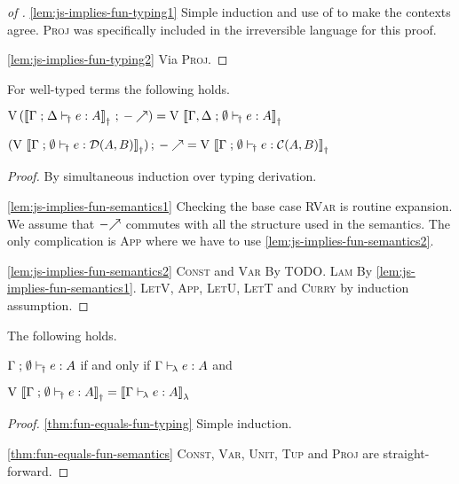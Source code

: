 \documentclass[runningheads,envcountsame]{llncs}
\begin{document}
    \begin{proof}[of ]
        \ref{lem:js-implies-fun-typing1} Simple induction and use of  to make the contexts agree. \textsc{Proj} was specifically included in the irreversible language for this proof.
        
        \ref{lem:js-implies-fun-typing2} Via \textsc{Proj}.
    \end{proof}
    
    \begin{lemma} \label{lem:js-implies-fun-semantics}
        For well-typed terms the following holds.
        \begin{lemmalist}
            \item $\uncurry\,(\comp{\semD{\typeruled{\Gamma}{\Delta}{e}{\js}{A}}}{\f{-}}) = \uncurry\,\semD{\typeruled{\Gamma,\Delta}{\emptyset}{e}{\fun}{A}}$ \label{lem:js-implies-fun-semantics1}
            \item $\comp{(\uncurry\,\semD{\typeruled{\Gamma}{\emptyset}{e}{\fun}{\homD{A}{B}}})}{\f{-}} = \uncurry\,\semD{\typeruled{\Gamma}{\emptyset}{e}{\fun}{\homC{A}{B}}}$ \label{lem:js-implies-fun-semantics2}
        \end{lemmalist}
    \end{lemma}
    \begin{proof}
        By simultaneous induction over typing derivation.
        
        \ref{lem:js-implies-fun-semantics1} Checking the base case \textsc{RVar} is routine expansion. We assume that $\f{-}$ commutes with all the structure used in the semantics. The only complication is \textsc{App} where we have to use \ref{lem:js-implies-fun-semantics2}.
        
        \ref{lem:js-implies-fun-semantics2} \textsc{Const} and \textsc{Var} By TODO. \textsc{Lam} By \ref{lem:js-implies-fun-semantics1}. \textsc{LetV}, \textsc{App}, \textsc{LetU}, \textsc{LetT} and \textsc{Curry} by induction assumption.
    \end{proof}
    
    \begin{theorem} \label{thm:fun-equals-fun}
        The following holds.
        \begin{theoremlist}
            \item $\Gamma \mathrel{;} \emptyset \vdash_{\!\dagger} e : A$ if and only if $\Gamma \vdash_{\!\lambda} e : A$ and \label{thm:fun-equals-fun-typing}
            \item $\uncurry\,\semD{\typeruled{\Gamma}{\emptyset}{e}{\fun}{A}} = \semL{\typerulel{\Gamma}{e}{A}}$ \label{thm:fun-equals-fun-semantics}
        \end{theoremlist}
    \end{theorem}
    \begin{proof}
        \ref{thm:fun-equals-fun-typing} Simple induction.
        
        \ref{thm:fun-equals-fun-semantics} \textsc{Const}, \textsc{Var}, \textsc{Unit}, \textsc{Tup} and \textsc{Proj} are straight-forward. 
    \end{proof}
    
\end{document}
